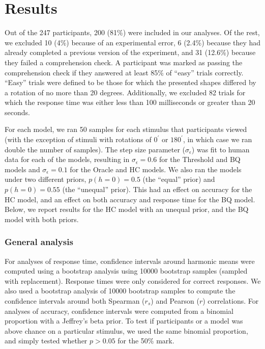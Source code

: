 \documentclass[10pt,letterpaper]{article}
\newcommand{\Oc}[0]{Oracle}
\newcommand{\Th}[0]{Threshold}
\newcommand{\Hc}[0]{HC}
\newcommand{\Bq}[0]{BQ}
\begin{document}
\section{Results}

Out of the 247 participants, 200 (81\%) were included in our
analyses. Of the rest, we excluded 10 (4\%) because of an experimental
error, 6 (2.4\%) because they had already completed a previous version
of the experiment, and 31 (12.6\%) because they failed a comprehension
check. A participant was marked as passing the comprehension check if
they answered at least 85\% of ``easy'' trials correctly. ``Easy''
trials were defined to be those for which the presented shapes
differed by a rotation of no more than 20 degrees. Additionally, we
excluded 82 trials for which the response time was either less than
100 milliseconds or greater than 20 seconds.

For each model, we ran 50 samples for each stimulus that participants
viewed (with the exception of stimuli with rotations of $0^\prime$ or
$180^\prime$, in which case we ran double the number of samples). The
step size parameter ($\sigma_\epsilon$) was fit to human data for each
of the models, resulting in $\sigma_\epsilon=0.6$ for the \Th{} and
\Bq{} models and $\sigma_\epsilon=0.1$ for the \Oc{} and \Hc{}
models. We also ran the models under two different priors,
$p(h=0)=0.5$ (the ``equal'' prior) and $p(h=0)=0.55$ (the ``unequal''
prior). This had an effect on accuracy for the \Hc{} model, and an
effect on both accuracy and response time for the \Bq{} model. Below,
we report results for the \Hc{} model with an unequal prior, and the
\Bq{} model with both priors.

\subsubsection{General analysis}

For analyses of response time, confidence intervals around harmonic
means were computed using a bootstrap analysis using 10000 bootstrap
samples (sampled with replacement). Response times were only
considered for correct responses.  We also used a bootstrap analysis
of 10000 bootstrap samples to compute the confidence intervals around
both Spearman ($r_s$) and Pearson ($r$) correlations.  For analyses of
accuracy, confidence intervals were computed from a binomial
proportion with a Jeffrey's beta prior.  To test if participants or a
model was above chance on a particular stimulus, we used the same
binomial proportion, and simply tested whether $p>0.05$ for the 50\%
mark.
\end{document}
